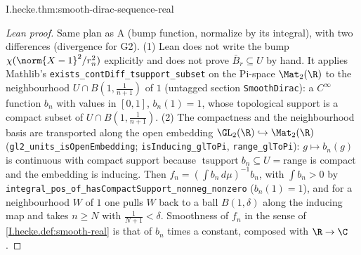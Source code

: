 \begin{theorem}
\end{theorem}
\begin{tfformal}{I.hecke.thm:smooth-dirac-sequence-real}
\end{tfformal}
\begin{proof}[Lean proof]
Same plan as A (bump function, normalize by its integral), with two differences (divergence for G2). (1) Lean does not write the bump $\chi(\norm{X-1}^2/r_n^2)$ explicitly and does not prove $\bar B_r\subseteq U$ by hand. It applies Mathlib's \texttt{exists\_contDiff\_tsupport\_subset} on the Pi-space $\Mat_2(\R)$ to the neighbourhood $U\cap B(1,\tfrac1{n+1})$ of $1$ (untagged section \texttt{SmoothDirac}): a $C^\infty$ function $b_n$ with values in $[0,1]$, $b_n(1)=1$, whose topological support is a compact subset of $U\cap B(1,\tfrac1{n+1})$. (2) The compactness and the neighbourhood basis are transported along the open embedding $\GL_2(\R)\hookrightarrow\Mat_2(\R)$ (\texttt{gl2\_units\_isOpenEmbedding}; \texttt{isInducing\_glToPi}, \texttt{range\_glToPi}): $g\mapsto b_n(g)$ is continuous with compact support because $\operatorname{tsupport}b_n\subseteq U=\text{range}$ is compact and the embedding is inducing. Then $f_n=(\int b_n\,d\mu)^{-1}b_n$, with $\int b_n>0$ by \texttt{integral\_pos\_of\_hasCompactSupport\_nonneg\_nonzero} ($b_n(1)=1$), and for a neighbourhood $W$ of $1$ one pulls $W$ back to a ball $B(1,\delta)$ along the inducing map and takes $n\ge N$ with $\tfrac1{N+1}<\delta$. Smoothness of $f_n$ in the sense of \cref{I.hecke.def:smooth-real} is that of $b_n$ times a constant, composed with $\R\to\C$.
\end{proof}

